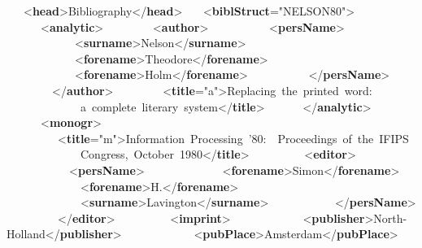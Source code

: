 \begin{shaded}
   {<\textbf{head}>}Bibliography{</\textbf{head}>}\newline
   {<\textbf{biblStruct}\hspace*{1em}{xml:id}="{NELSON80}">}\newline
      {<\textbf{analytic}>}\newline
        {<\textbf{author}>}\newline
          {<\textbf{persName}>}\newline
            {<\textbf{surname}>}Nelson{</\textbf{surname}>}\newline
            {<\textbf{forename}>}Theodore{</\textbf{forename}>}\newline
            {<\textbf{forename}>}Holm{</\textbf{forename}>}\newline
          {</\textbf{persName}>}\newline
        {</\textbf{author}>}\newline
        {<\textbf{title}\hspace*{1em}{level}="{a}">}Replacing the printed word:\newline
             a complete literary system{</\textbf{title}>}\newline
      {</\textbf{analytic}>}\newline
      {<\textbf{monogr}>}\newline
         {<\textbf{title}\hspace*{1em}{level}="{m}">}Information Processing '80:  Proceedings of the IFIPS\newline
             Congress, October 1980{</\textbf{title}>}\newline
         {<\textbf{editor}>}\newline
           {<\textbf{persName}>}\newline
             {<\textbf{forename}>}Simon{</\textbf{forename}>}\newline
             {<\textbf{forename}>}H.{</\textbf{forename}>}\newline
             {<\textbf{surname}>}Lavington{</\textbf{surname}>}\newline
           {</\textbf{persName}>}\newline
         {</\textbf{editor}>}\newline
         {<\textbf{imprint}>}\newline
            {<\textbf{publisher}>}North-Holland{</\textbf{publisher}>}\newline
            {<\textbf{pubPlace}>}Amsterdam{</\textbf{pubPlace}>}\newline

\end{shaded}
